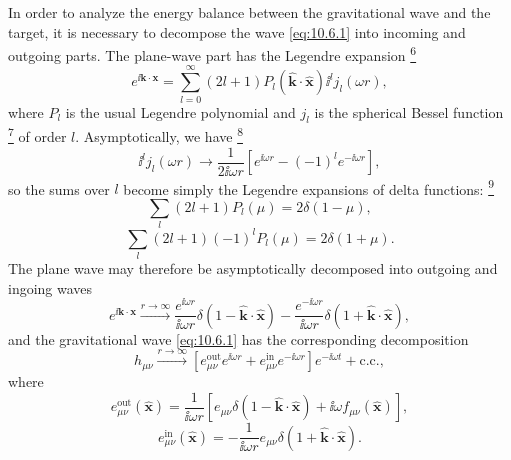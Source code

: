 In order to analyze the energy balance between the gravitational wave and the
target, it is necessary to decompose the wave \eqref{eq:10.6.1} into incoming
and outgoing parts. The plane-wave part has the Legendre expansion%
\hyperref[ch10-ref-6]{\textsuperscript{6}}
\[
  e^{\ii\mathbf{k}\cdot\mathbf{x}}
  =
  \sum_{l=0}^{\infty}
  (2l+1)P_l(\widehat{\mathbf{k}}\cdot\widehat{\mathbf{x}})
  \ii^l j_l(\omega r),
\]
where \(P_l\) is the usual Legendre polynomial and \(j_l\) is the spherical
Bessel function%
\hyperref[ch10-ref-7]{\textsuperscript{7}}
of order \(l\). Asymptotically, we have%
\hyperref[ch10-ref-8]{\textsuperscript{8}}
\[
  \ii^lj_l(\omega r)
  \longrightarrow
  \frac{1}{2\ii\omega r}
  \left[e^{\ii\omega r}-(-1)^le^{-\ii\omega r}\right],
\]
so the sums over \(l\) become simply the Legendre expansions of delta
functions:%
\hyperref[ch10-ref-9]{\textsuperscript{9}}
\[
  \sum_l(2l+1)P_l(\mu)=2\delta(1-\mu),
\]
\[
  \sum_l(2l+1)(-1)^lP_l(\mu)=2\delta(1+\mu).
\]
The plane wave may therefore be asymptotically decomposed into outgoing and
ingoing waves
\[
  e^{\ii\mathbf{k}\cdot\mathbf{x}}
  \xrightarrow{r\to\infty}
  \frac{e^{\ii\omega r}}{\ii\omega r}
  \delta(1-\widehat{\mathbf{k}}\cdot\widehat{\mathbf{x}})
  -
  \frac{e^{-\ii\omega r}}{\ii\omega r}
  \delta(1+\widehat{\mathbf{k}}\cdot\widehat{\mathbf{x}}),
\]
and the gravitational wave \eqref{eq:10.6.1} has the corresponding
decomposition
\begin{equation}
  h_{\mu\nu}
  \xrightarrow{r\to\infty}
  \left[
    e^{\mathrm{out}}_{\mu\nu}e^{\ii\omega r}
    +e^{\mathrm{in}}_{\mu\nu}e^{-\ii\omega r}
  \right]e^{-\ii\omega t}
  +\text{c.c.},
  \tag{10.6.2}\label{eq:10.6.2}
\end{equation}
where
\begin{equation}
  e^{\mathrm{out}}_{\mu\nu}(\widehat{\mathbf{x}})
  =
  \frac{1}{\ii\omega r}
  \left[
    e_{\mu\nu}
    \delta(1-\widehat{\mathbf{k}}\cdot\widehat{\mathbf{x}})
    +\ii\omega f_{\mu\nu}(\widehat{\mathbf{x}})
  \right],
  \tag{10.6.3}\label{eq:10.6.3}
\end{equation}
\begin{equation}
  e^{\mathrm{in}}_{\mu\nu}(\widehat{\mathbf{x}})
  =
  -\frac{1}{\ii\omega r}e_{\mu\nu}
  \delta(1+\widehat{\mathbf{k}}\cdot\widehat{\mathbf{x}}).
  \tag{10.6.4}\label{eq:10.6.4}
\end{equation}

